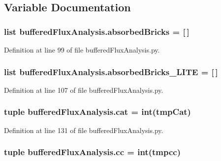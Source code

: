 \subsection{Variable Documentation}
\hypertarget{namespacebuffered_flux_analysis_acd39b5831b0a3150487f722fa3941723}{
\subsubsection[{absorbed\-Bricks}]{\setlength{\rightskip}{0pt plus 5cm}list buffered\-Flux\-Analysis.\-absorbed\-Bricks = \mbox{[}$\,$\mbox{]}}}\label{namespacebuffered_flux_analysis_acd39b5831b0a3150487f722fa3941723}


Definition at line 99 of file buffered\-Flux\-Analysis.\-py.

\hypertarget{namespacebuffered_flux_analysis_a4d8afcc76cdbe3ba251368426147cefd}{
\subsubsection[{absorbed\-Bricks\-\_\-\-L\-I\-T\-E}]{\setlength{\rightskip}{0pt plus 5cm}list buffered\-Flux\-Analysis.\-absorbed\-Bricks\-\_\-\-L\-I\-T\-E = \mbox{[}$\,$\mbox{]}}}\label{namespacebuffered_flux_analysis_a4d8afcc76cdbe3ba251368426147cefd}


Definition at line 107 of file buffered\-Flux\-Analysis.\-py.

\hypertarget{namespacebuffered_flux_analysis_a651bc7229b13b20528ca1a79030c6ac7}{
\subsubsection[{cat}]{\setlength{\rightskip}{0pt plus 5cm}tuple buffered\-Flux\-Analysis.\-cat = int(tmp\-Cat)}}\label{namespacebuffered_flux_analysis_a651bc7229b13b20528ca1a79030c6ac7}


Definition at line 131 of file buffered\-Flux\-Analysis.\-py.

\hypertarget{namespacebuffered_flux_analysis_a81b885fbd3a11be21610fd96c82952b7}{
\subsubsection[{cc}]{\setlength{\rightskip}{0pt plus 5cm}tuple buffered\-Flux\-Analysis.\-cc = int(tmpcc)}}\label{namespacebuffered_flux_analysis_a81b885fbd3a11be21610fd96c82952b7}


